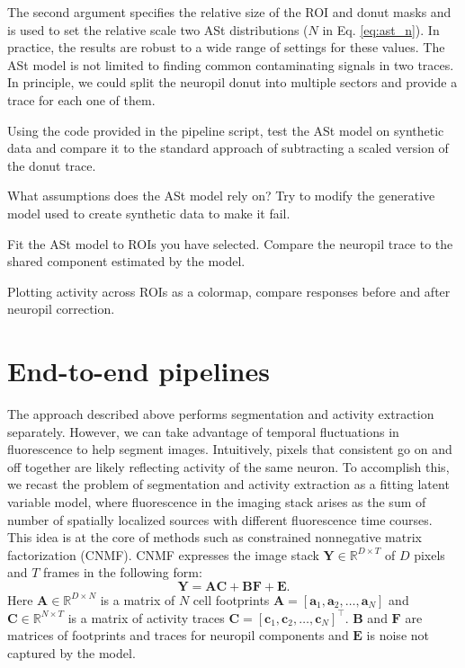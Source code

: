 \documentclass[a4paper]{report}
\newcommand{\nexercise}[0]{\arabic{exercises}\addtocounter{exercises}{1}}
\begin{document}
The second argument specifies the relative size of the ROI and donut masks and is used to set the relative scale two ASt distributions ($N$ in Eq. \ref{eq:ast_n}). 
In practice, the results are robust to a wide range of settings for these values. 
The ASt model is not limited to finding common contaminating signals in two traces. 
In principle, we could split the neuropil donut into multiple sectors and provide a trace for each one of them.
\begin{exercisebox}[frametitle={Exercise \nexercise: ASt model on synthetic data}]
Using the code provided in the pipeline script, test the ASt model on synthetic data and compare it to the standard approach of subtracting a scaled version of the donut trace.

What assumptions does the ASt model rely on? Try to modify the generative model used to create synthetic data to make it fail.
\end{exercisebox}

\begin{exercisebox}[frametitle={Exercise \nexercise: Neuropil correction}]
Fit the ASt model to ROIs you have selected.
Compare the neuropil trace to the shared component estimated by the model.

Plotting activity across ROIs as a colormap, compare responses before and after neuropil correction.
\end{exercisebox}

\section{End-to-end pipelines}
The approach described above performs segmentation and activity extraction separately. 
However, we can take advantage of temporal fluctuations in fluorescence to help segment images. 
Intuitively, pixels that consistent go on and off together are likely reflecting activity of the same neuron. 
To accomplish this, we recast the problem of segmentation and activity extraction as a fitting latent variable model, where fluorescence in the imaging stack arises as the sum of number of spatially localized sources with different fluorescence time courses.
This idea is at the core of methods such as constrained nonnegative matrix factorization (CNMF).
CNMF expresses the image stack $\mathbf{Y} \in \mathbb { R } ^ { D \times T }$ of $D$ pixels and $T$ frames in the following form:
\begin{equation}
	\mathbf{Y} = \mathbf{AC} + \mathbf{BF} + \mathbf{E}.
	\label{eq:cnmf}
\end{equation}
Here $\mathbf{A} \in \mathbb { R } ^ { D \times N }$ is a matrix of $N$ cell footprints $\mathbf{A} = [ \mathbf { a } _ { 1 } , \mathbf { a } _ { 2 } , \ldots , \mathbf { a } _ { N } ]$ and $\mathbf{C} \in \mathbb { R } ^ { N \times T }$ is a matrix of activity traces $\mathbf{C} = [ \mathbf { c } _ { 1 } , \mathbf { c } _ { 2 } , \ldots , \mathbf { c } _ { N } ] ^ { \top }$. 
$\mathbf{B}$ and $\mathbf{F}$ are matrices of footprints and traces for neuropil components and $\mathbf{E}$ is noise not captured by the model.
\end{document}
